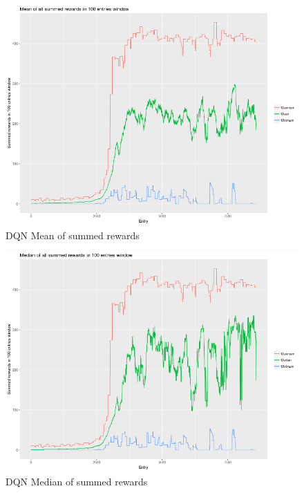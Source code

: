 \documentclass[11pt,twoside,a4paper]{article}
\begin{document}
\begin{figure}[H]
  \includegraphics[scale=0.35]{log-analysis/dqn-mean-summed-rewards.png}
  \centering
  \caption{DQN Mean of summed rewards}
  \label{fig:dqn-mean-summed-rewards}
\end{figure}

\begin{figure}[H]
  \includegraphics[scale=0.35]{log-analysis/dqn-median-summed-rewards.png}
  \centering
  \caption{DQN Median of summed rewards}
  \label{fig:dqn-median-summed-rewards}
\end{figure}
\end{document}
